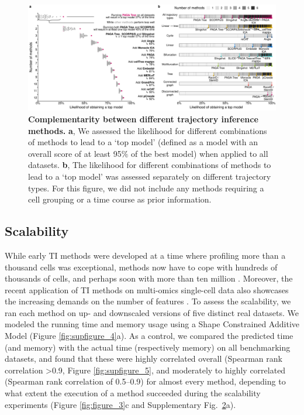 \begin{figure}[tbh!]
	\centering\includegraphics[width=\linewidth]{fig/figure_4.pdf}
	\caption{
		\textbf{Complementarity between different trajectory inference methods.}
		\textbf{a}, We assessed the likelihood for different combinations of methods to lead to a ‘top model’ (defined as a model with an overall score of at least 95$\%$ of the best model) when applied to all datasets. \textbf{b}, The likelihood for different combinations of methods to lead to a ‘top model’ was assessed separately on different trajectory types. For this figure, we did not include any methods requiring a cell grouping or a time course as prior information.
	}
	\label{fig:figure_4}
\end{figure}

\subsection{Scalability}

While early TI methods were developed at a time where profiling more than a thousand cells was exceptional, methods now have to cope with hundreds of thousands of cells, and perhaps soon with more than ten million \cite{svensson_exponentialscalingsinglecell_2018}. Moreover, the recent application of TI methods on multi-omics single-cell data also showcases the increasing demands on the number of features \cite{cao_jointprofilingchromatin_2018}. To assess the scalability, we ran each method on up- and downscaled versions of five distinct real datasets. We modeled the running time and memory usage using a Shape Constrained Additive Model \cite{pya_shapeconstrainedadditive_2015} (Figure \ref{fig:supfigure_4}a). As a control, we compared the predicted time (and memory) with the actual time (respectively memory) on all benchmarking datasets, and found that these were highly correlated overall (Spearman rank correlation >0.9, Figure \ref{fig:supfigure_5}, and moderately to highly correlated (Spearman rank correlation of 0.5–0.9) for almost every method, depending to what extent the execution of a method succeeded during the scalability experiments (Figure \ref{fig:figure_3}c and Supplementary Fig.~\href{https://github.com/dynverse/dynbenchmark_results/raw/master/08-summary/results_suppfig.pdf}{2}a).

